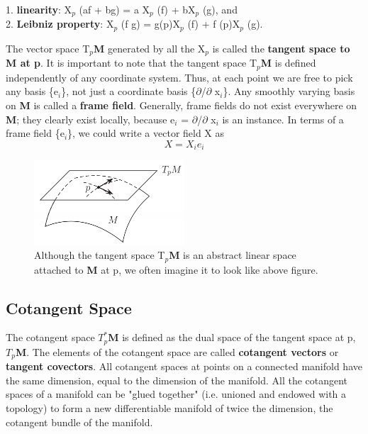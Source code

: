 1. \textbf{linearity}: X$_p$ (af + bg) = a X$_p$ (f) + bX$_p$ (g), and \\
2. \textbf{Leibniz property}: X$_p$ (f g) = g(p)X$_p$ (f) + f (p)X$_p$ (g).

The vector space T$_p$\textbf{M} generated by all the X$_p$ is called the \textbf{tangent space to
M at p}. It is important to note that the tangent space T$_p$\textbf{M} is defined independently of any
coordinate system. Thus, at each point we are free to pick any basis \{e$_i$\}, not just
a coordinate basis \{$\partial$/$\partial$ x$_i$\}. Any smoothly varying basis on \textbf{M} is called a \textbf{frame field}.
Generally, frame fields do not exist everywhere on \textbf{M}; they clearly exist
locally, because e$_i$ = $\partial$/$\partial$ x$_i$  is an instance. In terms of a frame field \{e$_i$\}, we could
write a vector field X as
\begin{equation}
    X = X_i e_i
\end{equation}

\begin{figure}[h]
    \begin{center}
        \includegraphics[width=0.5\textwidth]{figures/tangent-space.png}
        \caption{Although the tangent space T$_p$\textbf{M} is an abstract linear space attached to
        \textbf{M} at p, we often imagine it to look like above figure.}
    \end{center}
\end{figure}

\subsection{Cotangent Space}
The cotangent space $T_{p}^{*}$\textbf{M} is defined as the dual space of the tangent space at p, 
$T_{p}$\textbf{M}. The elements of the cotangent space are called \textbf{cotangent vectors} or \textbf{tangent covectors}.
All cotangent spaces at points on a connected manifold have the same dimension, equal to the dimension of the manifold. 
All the cotangent spaces of a manifold can be "glued together" (i.e. unioned and endowed with a topology) to form a new differentiable manifold of twice the dimension, the cotangent bundle of the manifold.


